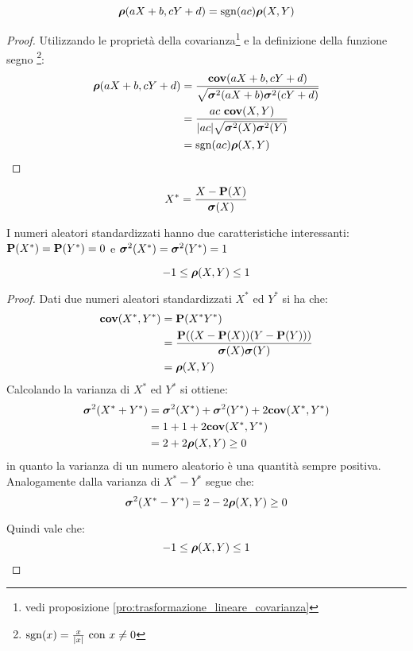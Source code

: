 \begin{proposition}
  \[ \boldsymbol\rho(aX + b, cY + d) = \operatorname{sgn}(ac) \boldsymbol\rho(X,Y) \]
\end{proposition}

\begin{proof}
  Utilizzando le proprietà della covarianza\footnote{vedi proposizione \ref{pro:trasformazione_lineare_covarianza}} e la definizione della funzione segno
  \footnote{\( \operatorname{sgn}(x) = \frac{x}{|x|} \mbox{~con~} x \ne 0 \)}:
  \begin{align*}
    \boldsymbol\rho(aX + b, cY + d) &= \frac{\mathbf{cov}(aX + b, cY + d)}{\sqrt{\boldsymbol\sigma^2(aX + b) \boldsymbol\sigma^2(cY + d)}} \\
    &= \frac{ac ~ \mathbf{cov}(X,Y)}{|ac| \sqrt{\boldsymbol\sigma^2(X) \boldsymbol\sigma^2(Y)}} \\
    &= \operatorname{sgn}(ac) \boldsymbol\rho(X,Y)
  \end{align*}
\end{proof}

\begin{definition}
  \[ X^* = \frac{X - \mathbf{P}(X)}{\boldsymbol\sigma(X)} \]
\end{definition}
I numeri aleatori standardizzati hanno due caratteristiche interessanti: \( \mathbf{P}(X^*) = \mathbf{P}(Y^*) = 0 \) e \( \boldsymbol\sigma^2(X^*) = \boldsymbol\sigma^2(Y^*) = 1 \)

\begin{proposition}
  \[ -1 \le \boldsymbol\rho(X,Y) \le 1 \]
\end{proposition}

\begin{proof}
  Dati due numeri aleatori standardizzati $X^*$ ed $Y^*$ si ha che:
  \begin{align*}
    \cov(X^*, Y^*) &= \pr(X^* Y^*) \\ %
    &= \frac{\pr((X - \pr(X))(Y - \pr(Y)))}{\sqm(X)\sqm(Y)} \\
    &= \cc(X,Y)
  \end{align*}
  Calcolando la varianza di $X^*$ ed $Y^*$ si ottiene:
  \begin{align*}
    \boldsymbol\sigma^2(X^* + Y^*) &= \boldsymbol\sigma^2(X^*) + \boldsymbol\sigma^2(Y^*) + 2 \mathbf{cov}(X^*, Y^*) \\
    &= 1 + 1 + 2 \mathbf{cov}(X^*, Y^*) \\
    &= 2 + 2\boldsymbol\rho(X,Y) \ge 0
  \end{align*}
  in quanto la varianza di un numero aleatorio è una quantità sempre positiva. Analogamente dalla varianza di \( X^* - Y^* \) segue che:
  \[ \boldsymbol\sigma^2(X^* - Y^*) = 2 - 2\boldsymbol\rho(X,Y) \ge 0 \]

  Quindi vale che:
  \[ -1 \le \boldsymbol\rho(X,Y) \le 1 \]
\end{proof}
